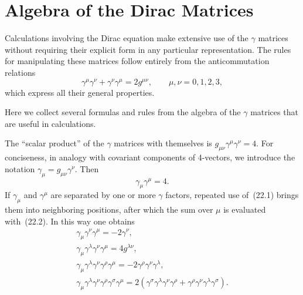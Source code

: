\section{Algebra of the Dirac Matrices}

Calculations involving the Dirac equation make extensive use of the $\gamma$ matrices without requiring their explicit form in any particular representation. The rules for manipulating these matrices follow entirely from the anticommutation relations
\begin{equation}
\gamma^\mu\gamma^\nu + \gamma^\nu\gamma^\mu = 2g^{\mu\nu},\qquad \mu, \nu = 0, 1, 2, 3,
\tag{22.1}
\end{equation}
which express all their general properties.

Here we collect several formulas and rules from the algebra of the $\gamma$ matrices that are useful in calculations.

The ``scalar product'' of the $\gamma$ matrices with themselves is $g_{\mu\nu}\gamma^\mu\gamma^\nu = 4$. For conciseness, in analogy with covariant components of 4-vectors, we introduce the notation $\gamma_\mu = g_{\mu\nu}\gamma^\nu$. Then
\begin{equation}
\gamma_\mu\gamma^\mu = 4.
\tag{22.2}
\end{equation}
If $\gamma_\mu$ and $\gamma^\mu$ are separated by one or more $\gamma$ factors, repeated use of~(22.1) brings them into neighboring positions, after which the sum over $\mu$ is evaluated with~(22.2). In this way one obtains
\begin{equation}
\begin{gathered}
\gamma_\mu\gamma^\nu\gamma^\mu = -2\gamma^\nu,\\
\gamma_\mu\gamma^\lambda\gamma^\nu\gamma^\mu = 4g^{\lambda\nu},\\
\gamma_\mu\gamma^\lambda\gamma^\nu\gamma^\rho\gamma^\mu = -2\gamma^\rho\gamma^\nu\gamma^\lambda,\\
\gamma_\mu\gamma^\lambda\gamma^\nu\gamma^\rho\gamma^\sigma\gamma^\mu = 2(\gamma^\sigma\gamma^\lambda\gamma^\nu\gamma^\rho + \gamma^\rho\gamma^\nu\gamma^\lambda\gamma^\sigma).
\end{gathered}
\tag{22.3}
\end{equation}

